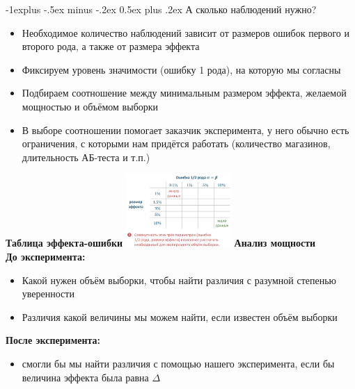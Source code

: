 \documentclass[10pt,landscape]{article}
\makeatletter
\renewcommand{\subsection}{\@startsection{subsection}{2}{0mm}%
                                {-1explus -.5ex minus -.2ex}%
                                {0.5ex plus .2ex}%
                                {\normalfont\normalsize\bfseries}}
\makeatother
\begin{document}
\begin{multicols}{3}
\subsection{А сколько наблюдений нужно?}
\begin{itemize}
    \item Необходимое количество наблюдений зависит
от размеров ошибок первого и второго рода, а также
от размера эффекта
\item Фиксируем уровень значимости (ошибку 1 рода),
на которую мы согласны
\item Подбираем соотношение между минимальным размером
эффекта, желаемой мощностью и объёмом выборки
\item В выборе соотношении помогает заказчик эксперимента,
у него обычно есть ограничения, с которыми нам придётся
работать (количество магазинов, длительность АБ-теста
и т.п.)
\end{itemize}
\newpage
\textbf{Таблица эффекта-ошибки}
\includegraphics[width=0.3\textwidth]{Screenshot from 2021-09-14 10-51-35.png}
\textbf{Анализ мощности}\\
\textbf{До эксперимента:}
\begin{itemize}
    \item Какой нужен объём выборки, чтобы найти различия
с разумной степенью уверенности
    \item Различия какой величины мы можем найти, если
известен объём выборки
\end{itemize}
\textbf{После эксперимента:}
\begin{itemize}
    \item смогли бы мы найти различия с помощью нашего
эксперимента, если бы величина эффекта была равна $\Delta$
\end{itemize}

\end{multicols}
\end{document}
